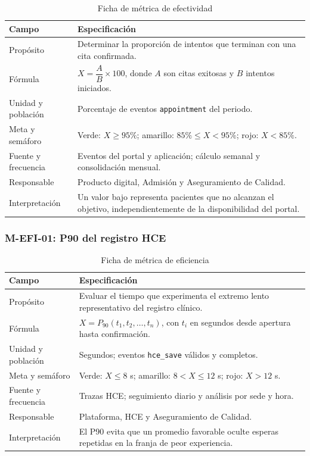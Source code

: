 \begin{table}[H]
\centering
\caption{Ficha de métrica de efectividad}
\begin{tabularx}{\textwidth}{p{3.3cm}Y}
\toprule
Campo & Especificación \\
\midrule
Propósito & Determinar la proporción de intentos que terminan con una cita confirmada. \\
Fórmula & $X=\dfrac{A}{B}\times100$, donde $A$ son citas exitosas y $B$ intentos iniciados. \\
Unidad y población & Porcentaje de eventos \texttt{appointment} del periodo. \\
Meta y semáforo & Verde: $X\geq95\%$; amarillo: $85\%\leq X<95\%$; rojo: $X<85\%$. \\
Fuente y frecuencia & Eventos del portal y aplicación; cálculo semanal y consolidación mensual. \\
Responsable & Producto digital, Admisión y Aseguramiento de Calidad. \\
Interpretación & Un valor bajo representa pacientes que no alcanzan el objetivo, independientemente de la disponibilidad del portal. \\
\bottomrule
\end{tabularx}
\end{table}

\subsubsection{M-EFI-01: P90 del registro HCE}

\begin{table}[H]
\centering
\caption{Ficha de métrica de eficiencia}
\begin{tabularx}{\textwidth}{p{3.3cm}Y}
\toprule
Campo & Especificación \\
\midrule
Propósito & Evaluar el tiempo que experimenta el extremo lento representativo del registro clínico. \\
Fórmula & $X=P_{90}(t_1,t_2,\ldots,t_n)$, con $t_i$ en segundos desde apertura hasta confirmación. \\
Unidad y población & Segundos; eventos \texttt{hce\_save} válidos y completos. \\
Meta y semáforo & Verde: $X\leq8$ s; amarillo: $8<X\leq12$ s; rojo: $X>12$ s. \\
Fuente y frecuencia & Trazas HCE; seguimiento diario y análisis por sede y hora. \\
Responsable & Plataforma, HCE y Aseguramiento de Calidad. \\
Interpretación & El P90 evita que un promedio favorable oculte esperas repetidas en la franja de peor experiencia. \\
\bottomrule
\end{tabularx}
\end{table}

